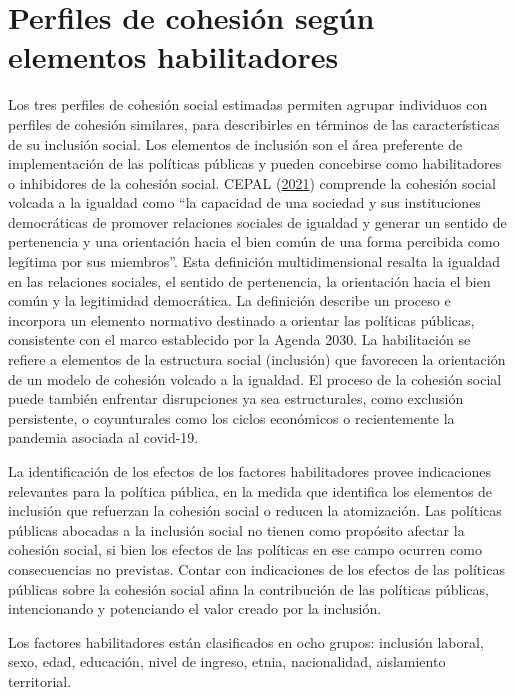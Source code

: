 \documentclass[
  12pt,
]{book}
\begin{document}
\hypertarget{perfiles-de-cohesiuxf3n-seguxfan-elementos-habilitadores}{%
\section{Perfiles de cohesión según elementos habilitadores}\label{perfiles-de-cohesiuxf3n-seguxfan-elementos-habilitadores}}

Los tres perfiles de cohesión social estimadas permiten agrupar individuos con perfiles de cohesión similares, para describirles en términos de las características de su inclusión social. Los elementos de inclusión son el área preferente de implementación de las políticas públicas y pueden concebirse como habilitadores o inhibidores de la cohesión social. CEPAL (\protect\hyperlink{ref-cepal_cohesion_2021}{2021}) comprende la cohesión social volcada a la igualdad como ``la capacidad de una sociedad y sus instituciones democráticas de promover relaciones sociales de igualdad y generar un sentido de pertenencia y una orientación hacia el bien común de una forma percibida como legítima por sus miembros''. Esta definición multidimensional resalta la igualdad en las relaciones sociales, el sentido de pertenencia, la orientación hacia el bien común y la legitimidad democrática. La definición describe un proceso e incorpora un elemento normativo destinado a orientar las políticas públicas, consistente con el marco establecido por la Agenda 2030. La habilitación se refiere a elementos de la estructura social (inclusión) que favorecen la orientación de un modelo de cohesión volcado a la igualdad. El proceso de la cohesión social puede también enfrentar disrupciones ya sea estructurales, como exclusión persistente, o coyunturales como los ciclos económicos o recientemente la pandemia asociada al covid-19.

La identificación de los efectos de los factores habilitadores provee indicaciones relevantes para la política pública, en la medida que identifica los elementos de inclusión que refuerzan la cohesión social o reducen la atomización. Las políticas públicas abocadas a la inclusión social no tienen como propósito afectar la cohesión social, si bien los efectos de las políticas en ese campo ocurren como consecuencias no previstas. Contar con indicaciones de los efectos de las políticas públicas sobre la cohesión social afina la contribución de las políticas públicas, intencionando y potenciando el valor creado por la inclusión.

Los factores habilitadores están clasificados en ocho grupos: inclusión laboral, sexo, edad, educación, nivel de ingreso, etnia, nacionalidad, aislamiento territorial.
\end{document}
